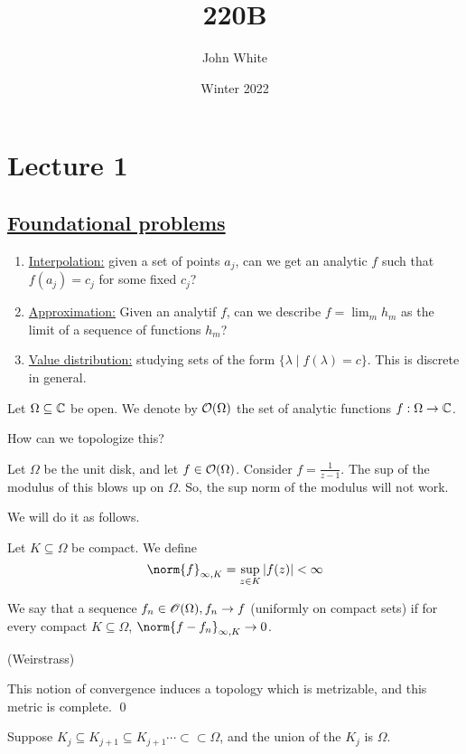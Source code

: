 \documentclass[x11names,reqno,14pt]{extarticle}
\title{220B}
\author{John White}
\date{Winter 2022}
\begin{document}
\section*{Lecture 1}

\subsection*{\underline{Foundational problems}}

\begin{enumerate}

\item \underline{Interpolation:} given a set of points $a_j$, can we get an analytic $f$ such that $f(a_j) = c_j$ for some fixed $c_j$?

\item \underline{Approximation:} Given an analytif $f$, can we describe $f = \lim_mh_m$ as the limit of a sequence of functions $h_m$?

\item \underline{Value distribution:} studying sets of the form $\{\lambda \mid f(\lambda) = c\}$. This is discrete in general. 

\end{enumerate}

Let $\Omega\subseteq\mathbb{C}$ be open. We denote by $\mathcal{O}(\Omega)$ the set of analytic functions $f:\Omega\to\mathbb{C}$. 

How can we topologize this? 

Let $\Omega$ be the unit disk, and let $f \in \mathcal{O}(\Omega)$. Consider $f = \frac{1}{z - 1}$. The sup of the modulus of this blows up on $\Omega$. So, the sup norm of the modulus will not work. 

We will do it as follows. 


Let $K \subseteq \Omega$ be compact. We define
\[
\norm{f}_{\oo, K} = \sup_{z\in K}|f(z)| < \oo
\]

 We say that a sequence $f_n \in \mathscr{O}(\Omega), f_n \to f$ (uniformly on compact sets) if for every compact $K \subseteq \Omega$, $\norm{f - f_n}_{\oo, K} \to 0$. 

\thm (Weirstrass)

This notion of convergence induces a topology which is metrizable, and this metric is complete. 
\proof
\qed

Suppose $K_j \subseteq K_{j + 1} \subseteq K_{j + 1} \cdots\subset\subset \Omega$, and the union of the $K_j$ is $\Omega$.
\end{document}
